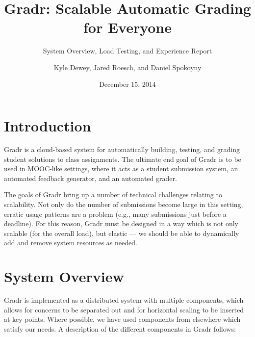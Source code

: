 \documentclass{scrartcl}
\begin{document}
\title{Gradr: Scalable Automatic Grading for Everyone}
\subtitle{System Overview, Load Testing, and Experience Report}
\author{Kyle Dewey, Jared Roesch, and Daniel Spokoyny}
\date{December 15, 2014}

\maketitle

\section{Introduction}
Gradr is a cloud-based system for automatically building, testing, and grading student solutions to class assignments.
The ultimate end goal of Gradr is to be used in MOOC-like settings, where it acts as a student submission system, an automated feedback generator, and an automated grader.

The goals of Gradr bring up a number of technical challenges relating to scalability.
Not only do the number of submissions become large in this setting, erratic usage patterns are a problem (e.g., many submissions just before a deadline).
For this reason, Gradr must be designed in a way which is not only scalable (for the overall load), but elastic --- we should be able to dynamically add and remove system resources as needed.

\section{System Overview}
Gradr is implemented as a distributed system with multiple components, which allows for concerns to be separated out and for horizontal scaling to be inserted at key points.
Where possible, we have used components from elsewhere which satisfy our needs.
A description of the different components in Gradr follows:
\end{document}

